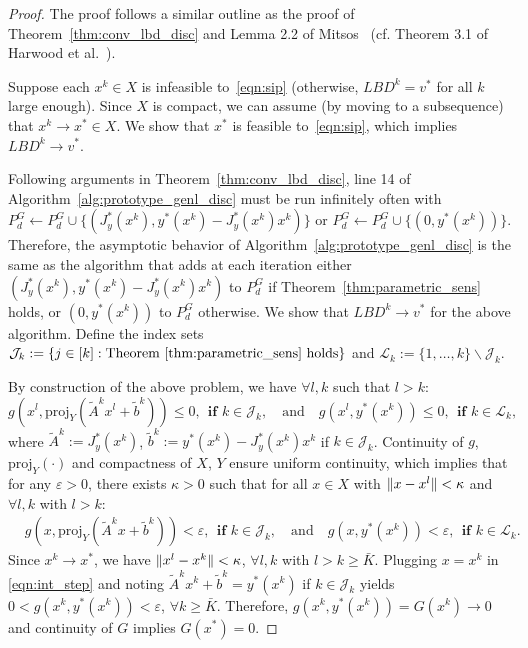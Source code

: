 \documentclass{article}
\DeclarePairedDelimiter\norm{\lVert}{\rVert}%
\newcommand{\1}[1]{\mathds{1}\left[#1\right]}
\begin{document}
\begin{proof}
The proof follows a similar outline as the proof of Theorem~\ref{thm:conv_lbd_disc} and Lemma 2.2 of Mitsos~\cite{mitsos2011global} (cf. Theorem 3.1 of Harwood et al.\ \cite{harwood2021note}).

Suppose each $x^k \in X$ is infeasible to~\eqref{eqn:sip} (otherwise, $LBD^k = v^*$ for all $k$ large enough).
Since $X$ is compact, we can assume (by moving to a subsequence) that $x^k \to x^* \in X$.
We show that $x^*$ is feasible to~\eqref{eqn:sip}, which implies $LBD^k \to v^*$.

Following arguments in Theorem~\ref{thm:conv_lbd_disc}, line 14 of Algorithm~\ref{alg:prototype_genl_disc} must be run infinitely often with $P^G_d \leftarrow P^G_d \cup \{ (J^*_y(x^k), y^*(x^k) - J^*_y(x^k) x^k) \}$ or $P^G_d \leftarrow P^G_d \cup \{ (0, y^*(x^k)) \}$.
Therefore, the asymptotic behavior of Algorithm~\ref{alg:prototype_genl_disc} is the same as the algorithm that adds at each iteration either $(J^*_y(x^k), y^*(x^k) - J^*_y(x^k) x^k)$ to $P^G_d$ if Theorem~\ref{thm:parametric_sens} holds, or $(0, y^*(x^k))$ to $P^G_d$ otherwise.
We show that $LBD^k \to v^*$ for the above algorithm.
Define the index sets $\mathcal{J}_k := \{j \in [k] : \text{Theorem~\ref{thm:parametric_sens} holds} \}$ and $\mathcal{L}_k := \{1,\dots,k\} \backslash \mathcal{J}_k$.

By construction of the above problem, we have $\forall l, k$ such that $l > k$:
\[
g(x^l, \text{proj}_Y(\tilde{A}^k x^l + \tilde{b}^k)) \leq 0, \:\: \textbf{if } k \in \mathcal{J}_k, \quad \text{and} \quad g(x^l, y^*(x^k)) \leq 0, \:\: \textbf{if } k \in \mathcal{L}_k,
\]
where $\tilde{A}^k := J^*_y(x^k)$, $\tilde{b}^k := y^*(x^k) - J^*_y(x^k) x^k$ if $k \in \mathcal{J}_k$. 
Continuity of $g$, $\text{proj}_Y(\cdot)$ and compactness of $X$, $Y$ ensure uniform continuity, which implies that for any $\varepsilon > 0$, there exists $\kappa > 0$ such that for all $x \in X$ with $\norm{x - x^l} < \kappa$ and $\forall l, k$ with $l > k$:
\begin{align}
\label{eqn:int_step}
&g(x, \text{proj}_Y(\tilde{A}^k x + \tilde{b}^k)) < \varepsilon, \:\: \textbf{if } k \in \mathcal{J}_k, \quad \text{and} \quad g(x, y^*(x^k)) < \varepsilon, \:\: \textbf{if } k \in \mathcal{L}_k.
\end{align}
Since $x^k \to x^*$, we have $\norm{x^l - x^k} < \kappa$, $\forall l, k$ with $l > k \geq \bar{K}$.
Plugging $x = x^k$ in \eqref{eqn:int_step} and noting $\tilde{A}^k x^k + \tilde{b}^k = y^*(x^k)$ if $k \in \mathcal{J}_k$ yields $0 < g(x^k, y^*(x^k)) < \varepsilon$, $\forall k \geq \bar{K}$. Therefore, $g(x^k, y^*(x^k)) = G(x^k) \to 0$ and continuity of $G$ implies $G(x^*) = 0$.
\end{proof}
\end{document}
